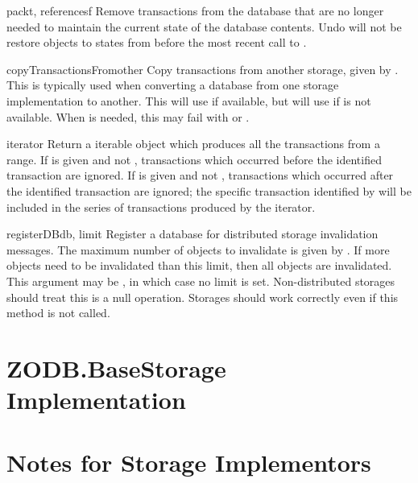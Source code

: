 \documentclass{howto}
\begin{document}
\begin{methoddesc}{pack}{t, referencesf}
  Remove transactions from the database that are no longer needed to
  maintain the current state of the database contents.  Undo will not
  be restore objects to states from before the most recent call to
  .
\end{methoddesc}

\begin{methoddesc}{copyTransactionsFrom}{other}
  Copy transactions from another storage, given by .  This
  is typically used when converting a database from one storage
  implementation to another.  This will use  if
  available, but will use  if  is
  not available.  When  is needed, this may fail with
   or .
\end{methoddesc}

\begin{methoddesc}{iterator}{}
  Return a iterable object which produces all the transactions from a
  range.  If  is given and not , transactions
  which occurred before the identified transaction are ignored.  If
   is given and not , transactions which occurred
  after the identified transaction are ignored; the specific
  transaction identified by  will be included in the series
  of transactions produced by the iterator.
\end{methoddesc}

\begin{methoddesc}{registerDB}{db, limit}
  Register a database  for distributed storage invalidation
  messages.  The maximum number of objects to invalidate is given by
  .  If more objects need to be invalidated than this
  limit, then all objects are invalidated.  This argument may be
  , in which case no limit is set.  Non-distributed
  storages should treat this is a null operation.  Storages should
  work correctly even if this method is not called.
\end{methoddesc}


\section{ZODB.BaseStorage Implementation}

\section{Notes for Storage Implementors}
\end{document}

